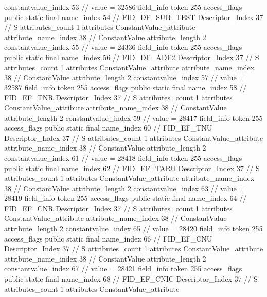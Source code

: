 {{{{{{{					constantvalue_index	53		// value = 32586
				}
				}
			}
			field_info {
				token	255
				access_flags	public static final
				name_index	54		// FID_DF_SUB_TEST
				Descriptor_Index	37		// S
				attributes_count	1
				attributes {
				ConstantValue_attribute {
					attribute_name_index	38		// ConstantValue
					attribute_length	2
					constantvalue_index	55		// value = 24336
				}
				}
			}
			field_info {
				token	255
				access_flags	public static final
				name_index	56		// FID_DF_ADF2
				Descriptor_Index	37		// S
				attributes_count	1
				attributes {
				ConstantValue_attribute {
					attribute_name_index	38		// ConstantValue
					attribute_length	2
					constantvalue_index	57		// value = 32587
				}
				}
			}
			field_info {
				token	255
				access_flags	public static final
				name_index	58		// FID_EF_TNR
				Descriptor_Index	37		// S
				attributes_count	1
				attributes {
				ConstantValue_attribute {
					attribute_name_index	38		// ConstantValue
					attribute_length	2
					constantvalue_index	59		// value = 28417
				}
				}
			}
			field_info {
				token	255
				access_flags	public static final
				name_index	60		// FID_EF_TNU
				Descriptor_Index	37		// S
				attributes_count	1
				attributes {
				ConstantValue_attribute {
					attribute_name_index	38		// ConstantValue
					attribute_length	2
					constantvalue_index	61		// value = 28418
				}
				}
			}
			field_info {
				token	255
				access_flags	public static final
				name_index	62		// FID_EF_TARU
				Descriptor_Index	37		// S
				attributes_count	1
				attributes {
				ConstantValue_attribute {
					attribute_name_index	38		// ConstantValue
					attribute_length	2
					constantvalue_index	63		// value = 28419
				}
				}
			}
			field_info {
				token	255
				access_flags	public static final
				name_index	64		// FID_EF_CNR
				Descriptor_Index	37		// S
				attributes_count	1
				attributes {
				ConstantValue_attribute {
					attribute_name_index	38		// ConstantValue
					attribute_length	2
					constantvalue_index	65		// value = 28420
				}
				}
			}
			field_info {
				token	255
				access_flags	public static final
				name_index	66		// FID_EF_CNU
				Descriptor_Index	37		// S
				attributes_count	1
				attributes {
				ConstantValue_attribute {
					attribute_name_index	38		// ConstantValue
					attribute_length	2
					constantvalue_index	67		// value = 28421
				}
				}
			}
			field_info {
				token	255
				access_flags	public static final
				name_index	68		// FID_EF_CNIC
				Descriptor_Index	37		// S
				attributes_count	1
				attributes {
				ConstantValue_attribute {
}}}}}}}
